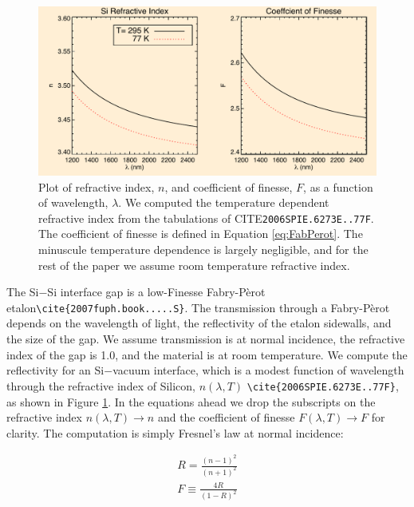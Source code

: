 \documentclass[osajnl,preprint,showpacs,superscriptaddress,12pt]{revtex4-1} %
\begin{document}
\begin{figure}[htbp]
\centerline{\includegraphics[width=0.95\columnwidth]{figs/SiIndexAOmgsFinesseFig.pdf}}
\caption{Plot of refractive index, $n$, and coefficient of finesse, $F$, as a function of wavelength, $\lambda$.\label{figSiIndexFinesse} We computed the temperature dependent refractive index from the tabulations of CITE\texttt{2006SPIE.6273E..77F}.  The coefficient of finesse is defined in Equation \ref{eq:FabPerot}.  The minuscule temperature dependence is largely negligible, and for the rest of the paper we assume room temperature refractive index.}
\end{figure}

The Si$-$Si interface gap is a low-Finesse Fabry-P\`{e}rot etalon\verb|\cite{2007fuph.book.....S}|.  The transmission through a Fabry-P\`{e}rot depends on the wavelength of light, the reflectivity of the etalon sidewalls, and the size of the gap.  We assume transmission is at normal incidence, the refractive index of the gap is 1.0, and the material is at room temperature.  We compute the reflectivity for an Si$-$vacuum interface, which is a modest function of wavelength through the refractive index of Silicon, $n(\lambda, T)$ \verb|\cite{2006SPIE.6273E..77F}|, as shown in Figure \ref{figSiIndexFinesse}.  In the equations ahead we drop the subscripts on the refractive index $n(\lambda, T) \rightarrow n$ and the coefficient of finesse $F(\lambda, T) \rightarrow F$ for clarity.  The computation is simply Fresnel's law at normal incidence:

\begin{eqnarray}
R = \frac{(n-1)^2}{(n+1)^2} \\
F \equiv \frac{4R}{(1-R)^2}
\end{eqnarray}
\end{document}
